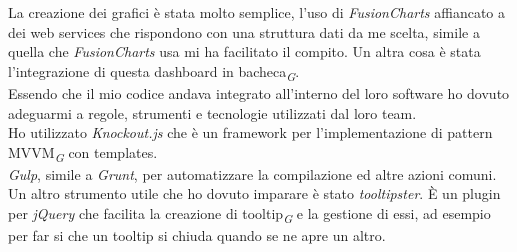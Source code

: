 \documentclass[a4paper, 12pt, twoside, openright]{book}
\newcommand{\gloss}[1]{#1\textsubscript{\textit{\tiny{G}}}}
\begin{document}
La creazione dei grafici è stata molto semplice, l'uso di \textit{FusionCharts} affiancato a dei web services che rispondono con una struttura dati da me scelta, simile a quella che \textit{FusionCharts} usa mi ha facilitato il compito. Un altra cosa è stata l'integrazione di questa dashboard in \gloss{bacheca}.\\
Essendo che il mio codice andava integrato all'interno del loro software ho dovuto adeguarmi a regole, strumenti e tecnologie utilizzati dal loro team.\\
Ho utilizzato \textit{Knockout.js} che è un framework per l'implementazione di pattern \gloss{MVVM} con templates.\\
\textit{Gulp}, simile a \textit{Grunt}, per automatizzare la compilazione ed altre azioni comuni.\\
Un altro strumento utile che ho dovuto imparare è stato \textit{tooltipster}. \`{E} un plugin per \textit{jQuery} che facilita la creazione di \gloss{tooltip} e la gestione di essi, ad esempio per far si che un tooltip si chiuda quando se ne apre un altro.\\
\end{document}
